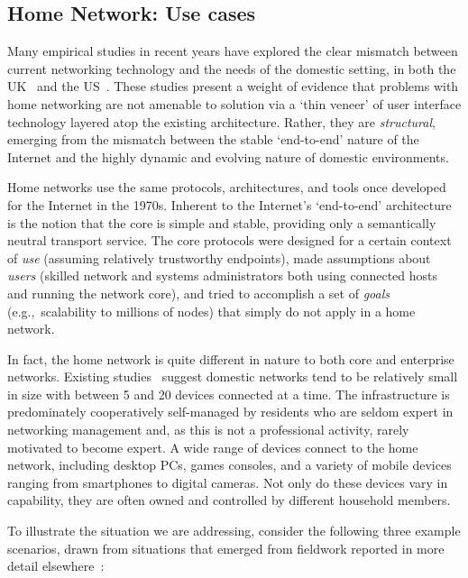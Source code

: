 \subsection{Home Network: Use cases} \label{sec:homework:use_cases}

Many empirical studies in recent years have explored the clear mismatch between
current networking technology and the needs of the domestic setting,  in both
the
UK~
and the
US~.
These studies present a weight of evidence that problems with home networking
are not amenable to solution via a `thin veneer' of user interface technology
layered atop the existing architecture.  Rather, they are \emph{structural},
emerging from the mismatch between the stable `end-to-end' nature of
the Internet and the highly dynamic and evolving nature of domestic
environments.  

Home networks use the same protocols, architectures, and tools once developed
for the Internet in the 1970s.  Inherent to the Internet's `end-to-end'
architecture is the notion that the core is simple and stable, providing only a
semantically neutral transport service.  The core protocols were designed for a
certain context of \emph{use} (assuming relatively trustworthy endpoints), made
assumptions about \emph{users} (skilled network and systems administrators both
using connected hosts and running the network core), and tried to accomplish a
set of \emph{goals} (e.g.,~scalability to millions of nodes) that simply do not
apply in a home network. 

In fact, the home network is quite different in nature to both core and
enterprise networks.  Existing studies~
suggest domestic networks tend to be relatively small in size with between 5 and
20 devices connected at a time.  The infrastructure is predominately
cooperatively self-managed by residents who are seldom expert in networking
management and, as this is not a professional activity, rarely motivated to
become expert.  A wide range of devices connect to the home network, including
desktop PCs, games consoles, and a variety of mobile devices ranging from
smartphones to digital cameras.  Not only do these devices vary in capability,
they are often owned and controlled by different household members.  

To illustrate the situation we are addressing, consider the following three
example scenarios, drawn from  situations that emerged from fieldwork 
reported in more detail elsewhere~: 

